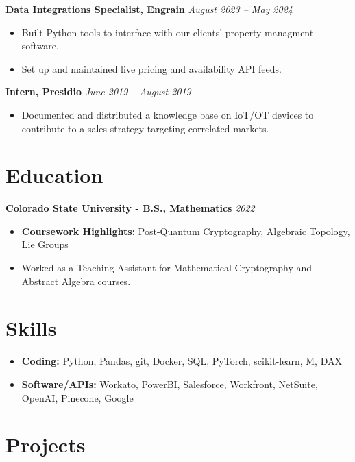 \documentclass[a4paper,10pt]{article}
\newcommand{\resumeEntry}[2]{%
  \noindent\textbf{#1} \hfill \textit{#2}\par\vspace{-0.5ex}%
}
\begin{document}
\resumeEntry{Data Integrations Specialist, Engrain}{August 2023 -- May 2024}
\begin{itemize}[leftmargin=*, noitemsep]
    \item Built Python tools to interface with our clients' property managment software.
    \item Set up and maintained live pricing and availability API feeds.
\end{itemize}

\resumeEntry{Intern, Presidio}{June 2019 -- August 2019}
\begin{itemize}[leftmargin=*, noitemsep]
    \item Documented and distributed a knowledge base on IoT/OT devices to contribute to a sales strategy 
    targeting correlated markets.
\end{itemize}

\section*{Education}

\resumeEntry{Colorado State University - B.S., Mathematics}{2022}
\begin{itemize}[leftmargin=*, noitemsep]
    \item \textbf{Coursework Highlights:} Post-Quantum Cryptography, Algebraic Topology, Lie Groups
    \item Worked as a Teaching Assistant for Mathematical Cryptography and Abstract Algebra courses.
\end{itemize}

\section*{Skills}
\begin{itemize}[leftmargin=*, noitemsep]
    \item \textbf{Coding:} Python, Pandas, git, Docker, SQL, PyTorch, scikit-learn, M, DAX
    \item \textbf{Software/APIs:} Workato, PowerBI, Salesforce, Workfront, NetSuite, OpenAI, Pinecone, Google
\end{itemize}

\section*{Projects}
\end{document}
